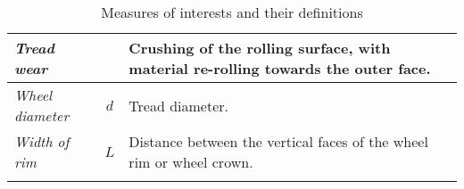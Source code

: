 \begin{longtable}{|p{3cm}|c|p{8cm}|}
  \hline
  \textit{Tread wear}                                   &                 & Crushing of the rolling surface, with material re-rolling towards the outer face. \\
  \hline
  \textit{Wheel diameter}                               &  $d$            & Tread diameter. \\
  \hline
  \textit{Width of rim}                                 &  $L$            & Distance between the vertical faces of the wheel rim or wheel crown. \\
  \hline
  
  \caption{Measures of interests and their definitions}
  \label{tab:measures}
\end{longtable}
